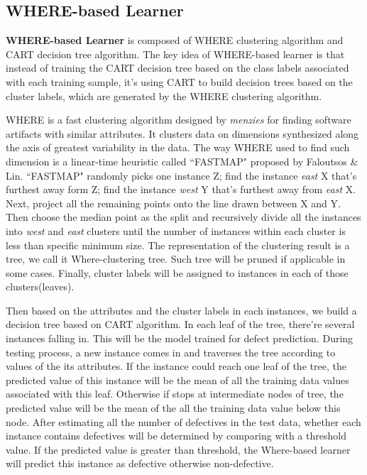 \documentclass{acm_proc_article-sp}
\begin{document}
\subsection{WHERE-based Learner}
\textbf{WHERE-based Learner} is composed of WHERE clustering algorithm and CART 
decision tree algorithm. The key idea of WHERE-based learner is that  instead of training the 
CART decision tree based on the class labels associated with each training sample, it's using 
CART to build decision trees based on the cluster labels, which are generated by the WHERE 
clustering algorithm.
 
 
WHERE is a fast clustering algorithm designed by {\it menzies} for finding software artifacts 
with similar attributes. It clusters data on dimensions synthesized along the axis of greatest 
variability in the data. The way WHERE used to find such dimension is a linear-time heuristic 
called ``FASTMAP" proposed by Faloutsos \& Lin\cite{faloutsos1995fastmap}. ``FASTMAP" 
randomly picks one instance Z; find the instance {\it east} X that's furthest away form Z; find 
the instance {\it west} Y that's furthest away from {\it east} X. Next, project all the remaining 
points onto the line drawn between X and Y. Then choose the median point as the split and 
recursively divide all the instances into {\it west} and {\it east} clusters until the number of 
instances within each cluster is less than specific minimum size. The representation of the 
clustering result is a tree, we call it Where-clustering tree. Such tree will be pruned if applicable 
in some cases. Finally, cluster labels  will be assigned to instances in each of those 
clusters(leaves). 


Then based on the attributes and the cluster labels in each instances,  we build a 
decision tree based on CART algorithm. In each leaf of the tree, there're several instances 
falling in. This will be the model trained for defect prediction. During testing process, a new 
instance comes in and traverses the tree according to 
values of the its attributes. If the instance could reach one leaf of the tree, the predicted value 
of this instance will be the mean  of all the training data values associated with this leaf. 
Otherwise if stops at intermediate nodes of tree, the predicted value will be the mean of the all 
the training data value below this node. After estimating all the number of defectives in the test 
data, whether each instance contains defectives will be determined by comparing with a threshold value. If the predicted value is greater than threshold, the Where-based learner will predict this instance as defective otherwise non-defective.
\end{document}
